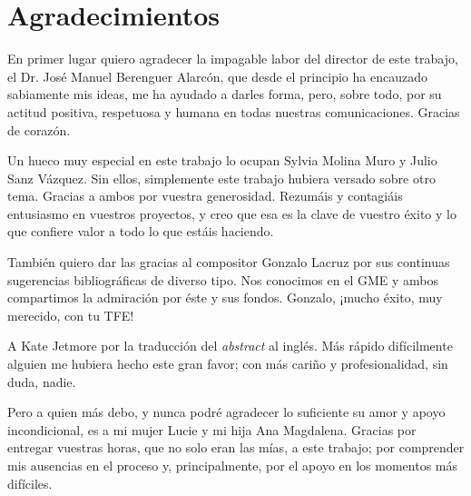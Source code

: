 \chapter[Agradecimientos]{Agradecimientos}


En primer lugar quiero agradecer la impagable labor del director de este trabajo, el Dr. José Manuel Berenguer Alarcón, que desde el principio ha encauzado sabiamente mis ideas, me ha ayudado a darles forma, pero, sobre todo, por su actitud positiva, respetuosa y humana en todas nuestras comunicaciones. Gracias de corazón. 

Un hueco muy especial en este trabajo lo ocupan Sylvia Molina Muro y Julio Sanz Vázquez. Sin ellos, simplemente este trabajo hubiera versado sobre otro tema. Gracias a ambos por vuestra generosidad. Rezumáis y contagiáis entusiasmo en vuestros proyectos, y creo que esa es la clave de vuestro éxito y lo que confiere valor a todo lo que estáis haciendo.

También quiero dar las gracias al compositor Gonzalo Lacruz por sus continuas sugerencias bibliográficas de diverso tipo. Nos conocimos en el GME y ambos compartimos la admiración por éste y sus fondos. Gonzalo, ¡mucho éxito, muy merecido, con tu TFE!

A Kate Jetmore por la traducción del \textit{abstract} al inglés. Más rápido difícilmente alguien me hubiera hecho este gran favor; con más cariño y profesionalidad, sin duda, nadie.

Pero a quien más debo, y nunca podré agradecer lo suficiente su amor y apoyo incondicional, es a mi mujer Lucie y mi hija Ana Magdalena. Gracias por entregar vuestras horas, que no solo eran las mías, a este trabajo; por comprender mis ausencias en el proceso y, principalmente, por el apoyo en los momentos más difíciles. 


